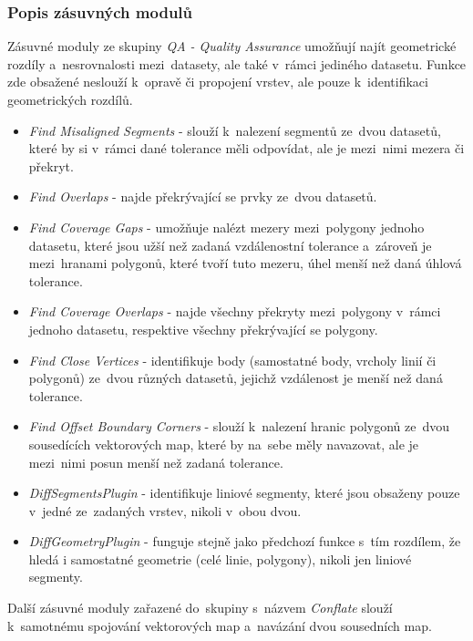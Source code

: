 \subsubsection{Popis zásuvných modulů}

Zásuvné moduly ze skupiny \textit{QA - Quality Assurance} umožňují najít geometrické rozdíly a~nesrovnalosti mezi~datasety, ale také v~rámci jediného datasetu. Funkce zde
obsažené neslouží k~opravě či propojení vrstev, ale pouze k~identifikaci geometrických rozdílů.

\begin{itemize}[leftmargin=*]
 \item \textit{Find Misaligned Segments} - slouží k~nalezení segmentů ze~dvou datasetů, které by si v~rámci dané tolerance měli odpovídat, ale je mezi~nimi mezera či překryt. 
 \item \textit{Find Overlaps} - najde překrývající se prvky ze~dvou datasetů.
 \item \textit{Find Coverage Gaps} - umožňuje nalézt mezery mezi~polygony jednoho datasetu, které jsou užší než zadaná vzdálenostní tolerance a~zároveň je mezi~hranami polygonů,
	které tvoří tuto mezeru, úhel menší než daná úhlová tolerance.
 \item \textit{Find Coverage Overlaps} - najde všechny překryty mezi~polygony v~rámci jednoho datasetu, respektive všechny překrývající se polygony.
 \item \textit{Find Close Vertices} - identifikuje body (samostatné body, vrcholy linií či polygonů) ze~dvou různých datasetů, jejichž vzdálenost je menší než daná tolerance.
 \item \textit{Find Offset Boundary Corners} - slouží k~nalezení hranic polygonů ze~dvou sousedících vektorových map, které by na~sebe měly navazovat, ale je mezi~nimi posun
	menší než zadaná tolerance.
 \item \textit{DiffSegmentsPlugin} - identifikuje liniové segmenty, které jsou obsaženy pouze v~jedné ze~zadaných vrstev, nikoli v~obou dvou.
 \item \textit{DiffGeometryPlugin} - funguje stejně jako předchozí funkce s~tím rozdílem, že hledá i samostatné geometrie (celé linie, polygony), nikoli jen liniové segmenty.
\end{itemize}

Další zásuvné moduly zařazené do~skupiny s~názvem \textit{Conflate} slouží k~samotnému spojování vektorových map a~navázání dvou sousedních map.

